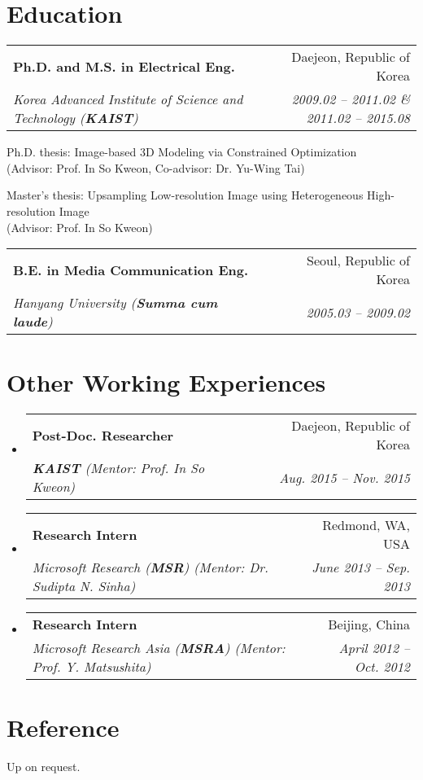 \documentclass[letterpaper,11pt]{article}
\makeatletter
\newcommand{\resumeItem}[1]{
  \small{
  \item{#1 \vspace{-2pt}}
  }
}
\newcommand{\resumeSubheading}[4]{
  \vspace{-2pt}\item
    \begin{tabular*}{0.97\textwidth}[t]{l@{\extracolsep{\fill}}r}
      \textbf{#1} & #2 \\
      \textit{\small#3} & \textit{\small #4} \\
    \end{tabular*}\vspace{-7pt}
}
\newcommand{\resumeSubHeadingListStart}{\begin{itemize}[leftmargin=0.15in, label={}]}
\newcommand{\resumeSubHeadingListEnd}{\end{itemize}}
\newcommand{\resumeItemListStart}{\begin{itemize}}
\newcommand{\resumeItemListEnd}{\end{itemize}\vspace{-5pt}}
\makeatother
\begin{document}
\section{Education}
  \resumeSubHeadingListStart
    \resumeSubheading
      {Ph.D. and M.S. in Electrical Eng.}{Daejeon, Republic of Korea}
      {Korea Advanced Institute of Science and Technology \textnormal{(\textbf{KAIST})}}{2009.02 -- 2011.02 \& 2011.02 -- 2015.08}
        \resumeItemListStart
        \resumeItem{Ph.D. thesis: Image-based 3D Modeling via Constrained Optimization \\(Advisor: Prof. In So Kweon, Co-advisor: Dr. Yu-Wing Tai)}
        \resumeItem{Master's thesis: Upsampling Low-resolution Image using Heterogeneous High-resolution Image \\(Advisor: Prof. In So Kweon)}
        \resumeItemListEnd
    \resumeSubheading
      {B.E. in Media Communication Eng.}{Seoul, Republic of Korea}
      {Hanyang University (\textbf{Summa cum laude})}{2005.03 -- 2009.02}
  \resumeSubHeadingListEnd








\section{Other Working Experiences}
  \resumeSubHeadingListStart    
    \resumeSubheading
      {Post-Doc. Researcher}{Daejeon, Republic of Korea}
      {\textnormal{\textbf{KAIST}} (Mentor: Prof. In So Kweon)}{Aug. 2015 -- Nov. 2015}
    \resumeSubheading
      {Research Intern}{Redmond, WA, USA}
      {Microsoft Research \textnormal{(\textbf{MSR})} (Mentor: Dr. Sudipta N. Sinha)}{June 2013 -- Sep. 2013}
    \resumeSubheading
      {Research Intern}{Beijing, China}
      {Microsoft Research Asia \textnormal{(\textbf{MSRA})} (Mentor: Prof. Y. Matsushita)}{April 2012 -- Oct. 2012}     
  \resumeSubHeadingListEnd

\section{Reference}
  \resumeItemListStart
  \resumeItem{Up on request.}
  \resumeItemListEnd
  
\end{document}
